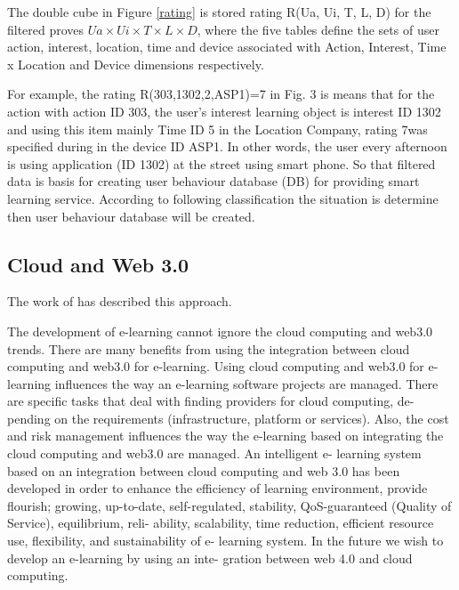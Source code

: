 \documentclass[journal]{vgtc}                %
\begin{document}
  The double cube in Figure \ref{rating} is stored rating R(Ua, Ui, T, L, D) for the filtered proves $Ua \times Ui \times T \times L \times D$, where the five tables define the sets of user action, interest, location, time and device associated with Action, Interest, Time x Location and Device dimensions respectively.

  For example, the rating R(303,1302,2,ASP1)=7 in Fig. 3 is means that for the action with action ID 303, the user's interest learning object is interest ID 1302 and using this item mainly Time ID 5 in the Location Company, rating 7was specified during in the device ID ASP1. In other words, the user every afternoon is using application (ID 1302) at the street using smart phone. So that filtered data is basis for creating user behaviour database (DB) for providing smart learning service. According to following classification the situation is determine then user behaviour database will be created.

  
  \subsection{Cloud and Web 3.0}
  The work of \cite{nasr2012proposed} has described this approach.

  The development of e-learning cannot ignore the cloud computing and web3.0 trends. There are many benefits from using the integration between cloud computing and web3.0 for e-learning. Using cloud computing and web3.0 for e-learning influences the way an e-learning software projects are managed. There are specific tasks that deal with finding providers for cloud computing, de- pending on the requirements (infrastructure, platform or services). Also, the cost and risk management influences the way the e-learning based on integrating the cloud computing and web3.0 are managed. An intelligent e- learning system based on an integration between cloud computing and web 3.0 has been developed in order to enhance the efficiency of learning environment, provide flourish; growing, up-to-date, self-regulated, stability, QoS-guaranteed (Quality of Service), equilibrium, reli- ability, scalability, time reduction, efficient resource use, flexibility, and sustainability of e- learning system. In the future we wish to develop an e-learning by using an inte- gration between web 4.0 and cloud computing.
\end{document}
